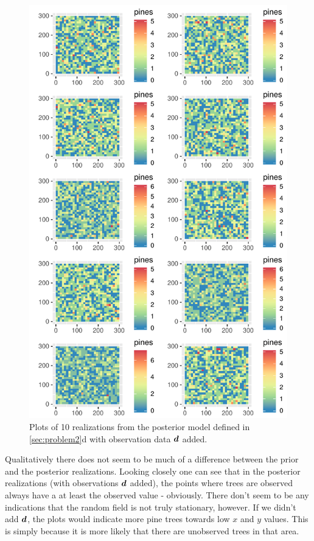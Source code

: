 \begin{figure}
    \centering
    \includegraphics{figures/p2_posterior_sims.pdf}
    \caption{Plots of 10 realizations from the posterior model defined in \ref{sec:problem2}d with observation data $\bm{d}$ added.}
    \label{fig:p2_posterior_sims}
\end{figure}

Qualitatively there does not seem to be much of a difference between the prior and the posterior realizations. Looking closely one can see that in the posterior realizations (with observations $\bm{d}$ added), the points where trees are observed always have a at least the observed value - obviously. There don't seem to be any indications that the random field is not truly stationary, however. If we didn't add $\bm{d}$, the plots would indicate more pine trees towards low $x$ and $y$ values. This is simply because it is more likely that there are unobserved trees in that area.

